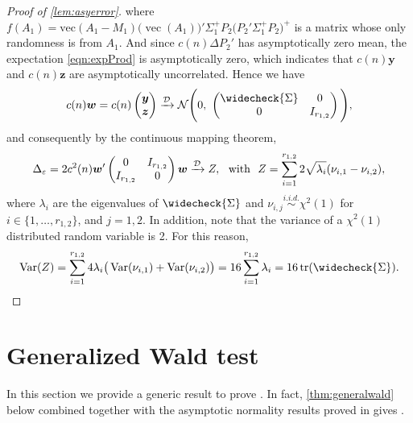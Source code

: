 \documentclass[12pt]{article}
\numberwithin{equation}{section}
\numberwithin{table}{section}
\numberwithin{thm}{section}
\numberwithin{defn}{section}
\numberwithin{lem}{section}
\numberwithin{prop}{section}
\numberwithin{cor}{section}
\numberwithin{rem}{section}
\DeclareMathOperator{\Vector}{vec}
\DeclareMathOperator{\tr}{tr}
\DeclareMathOperator{\var}{Var}
\begin{document}
\begin{appendix}
\begin{proof}[Proof of \autoref{lem:asyerror}]
where $f(A_1) = \mbox{vec}(A_1 - M_1) \big(\Vector(A_1)\big)' \Sigma_1^{+} P_2 \big(P_2' \Sigma_1^+ P_2\big)^+$ is a matrix whose only randomness is from $A_1$. And since $c(n) \Delta P_2'$ has asymptotically zero mean, the expectation \eqref{eqn:expProd} is asymptotically zero, which indicates that $c(n) \bm{y}$ and $c(n) \bm{z}$ are asymptotically uncorrelated. Hence we have
$$
c(n) \bm{w} = c(n) \begin{pmatrix} \bm{y} \\ \bm{z} \end{pmatrix} \xrightarrow{\mathcal{D}} \mathcal{N}\Bigg(0, ~ \begin{pmatrix} \widecheck{\Sigma} & 0 \\ 0 & I_{r_{1,2}} \end{pmatrix}\Bigg),
$$
and consequently by the continuous mapping theorem,
$$
\Delta_\varepsilon = 2 c^2(n) \bm{w}' \begin{pmatrix} 0 & I_{r_{1,2}} \\ I_{r_{1,2}} & 0 \end{pmatrix} \bm{w} \xrightarrow{\mathcal{D}} 
Z, \hspace{0.12cm} \text{ with } \hspace{0.12cm} Z= 
\sum_{i = 1}^{r_{1,2}} 2\sqrt{\lambda_i} (\nu_{i,1} - \nu_{i,2}),
$$
where $\lambda_i$ are the eigenvalues of $\widecheck{\Sigma}$ and $\nu_{i,j} \stackrel{i.i.d.}{\sim} \chi^2(1)$ for $i \in \{1, \dots, r_{1,2}\}$, and $j = 1,2$. In addition, note that the variance of a $\chi^2(1)$ distributed random variable is 2. For this reason,
$$
\var(Z) = \sum_{i=1}^{r_{1,2}} 4 \lambda_i \big(\var(\nu_{i,1}) + \var(\nu_{i,2})\big) = 16 \sum_{i=1}^{r_{1,2}} \lambda_i = 16 \tr(\widecheck{\Sigma}).
$$
\end{proof}
\section{Generalized Wald test}\label{app:est}

In this section we provide a generic result to prove . In fact, \autoref{thm:generalwald} below combined together with the asymptotic normality results proved in  gives .


\end{appendix}
\end{document}
